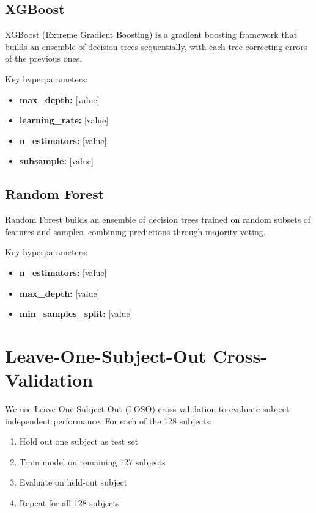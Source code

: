 \subsection{XGBoost}
\label{subsec:xgboost}

XGBoost (Extreme Gradient Boosting) \cite{TODO_ADD_XGBOOST_PAPER} is a gradient boosting framework that builds an ensemble of decision trees sequentially, with each tree correcting errors of the previous ones.

Key hyperparameters:
\begin{itemize}
    \item \textbf{max\_depth:} [value]
    \item \textbf{learning\_rate:} [value]
    \item \textbf{n\_estimators:} [value]
    \item \textbf{subsample:} [value]
\end{itemize}


\subsection{Random Forest}
\label{subsec:random_forest}

Random Forest \cite{TODO_ADD_RF_PAPER} builds an ensemble of decision trees trained on random subsets of features and samples, combining predictions through majority voting.

Key hyperparameters:
\begin{itemize}
    \item \textbf{n\_estimators:} [value]
    \item \textbf{max\_depth:} [value]
    \item \textbf{min\_samples\_split:} [value]
\end{itemize}


\section{Leave-One-Subject-Out Cross-Validation}
\label{sec:loso_method}

We use Leave-One-Subject-Out (LOSO) cross-validation to evaluate subject-independent performance. For each of the 128 subjects:

\begin{enumerate}
    \item Hold out one subject as test set
    \item Train model on remaining 127 subjects
    \item Evaluate on held-out subject
    \item Repeat for all 128 subjects
\end{enumerate}

